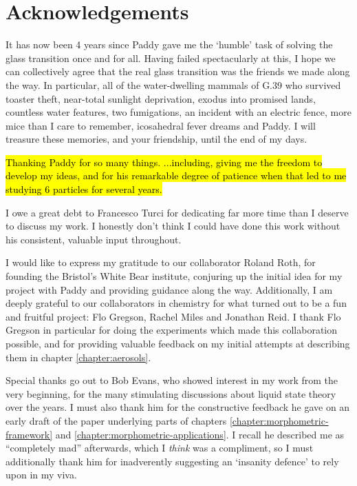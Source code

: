 
\chapter*{Acknowledgements}

It has now been 4 years since Paddy gave me the `humble' task of solving the glass transition once and for all.
Having failed spectacularly at this, I hope we can collectively agree that the real glass transition was the friends we made along the way.
In particular, all of the water-dwelling mammals of G.39 who survived toaster theft, near-total sunlight deprivation, exodus into promised lands, countless water features, two fumigations, an incident with an electric fence, more mice than I care to remember, icosahedral fever dreams and Paddy.
I will treasure these memories, and your friendship, until the end of my days.

\hl{Thanking Paddy for so many things.
  ...including, giving me the freedom to develop my ideas, and for his remarkable degree of patience when that led to me studying 6 particles for several years.}

I owe a great debt to Francesco Turci for dedicating far more time than I deserve to discuss my work.
I honestly don't think I could have done this work without his consistent, valuable input throughout.

I would like to express my gratitude to our collaborator Roland Roth, for founding the Bristol's White Bear institute, conjuring up the initial idea for my project with Paddy and providing guidance along the way.
Additionally, I am deeply grateful to our collaborators in chemistry for what turned out to be a fun and fruitful project: Flo Gregson, Rachel Miles and Jonathan Reid.
I thank Flo Gregson in particular for doing the experiments which made this collaboration possible, and for providing valuable feedback on my initial attempts at describing them in chapter \ref{chapter:aerosols}.

Special thanks go out to Bob Evans, who showed interest in my work from the very beginning, for the many stimulating discussions about liquid state theory over the years.
I must also thank him for the constructive feedback he gave on an early draft of the paper underlying parts of chapters \ref{chapter:morphometric-framework} and \ref{chapter:morphometric-applications}.
I recall he described me as ``completely mad'' afterwards, which I \emph{think} was a compliment, so I must additionally thank him for inadverently suggesting an `insanity defence' to rely upon in my viva.

